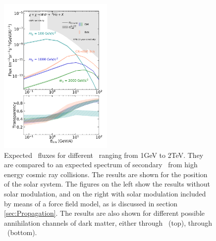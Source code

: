 \begin{figure}
    \includegraphics[width=0.49\textwidth]{figures/he3bar_WW_SM.png}
    
    \caption{Expected \ahe\ fluxes for different \dmm\ ranging from 1GeV to 2TeV. They are compared to an expected spectrum of secondary \ahe\ from high energy cosmic ray collisions. The results are shown for the position of the solar system. The figures on the left show the results without solar modulation, and on the right with solar modulation included by means of a force field model, as is discussed in section \ref{sec:Propagation}. The results are also shown for different possible annihilation channels of dark matter, either through \WW\ (top), through \bb\ (bottom).}
    \label{fig:Results_He3_fluxes_diff_DM_masses}
\end{figure}
